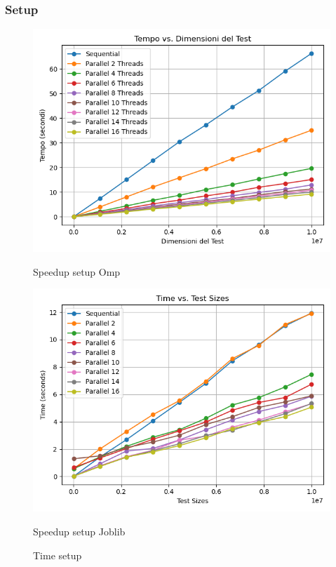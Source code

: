 \documentclass[11pt]{article}
\begin{document}
    \subsubsection{Setup}\label{subsubsec:fpr-010-setup}
    \begin{figure}[H]
        \centering
        \includegraphics[width=\linewidth]{omp/010/setup_time_plot}
            \caption{Speedup setup Omp}\label{fig:010-setup_time_omp}
        \endminipage\hfill
        \includegraphics[width=\linewidth]{joblib/010/setup_time_plot}
            \caption{Speedup setup Joblib}\label{fig:010setup_time_joblib}
        \endminipage\hfill
        \caption{Time setup}
    \end{figure}
\end{document}

